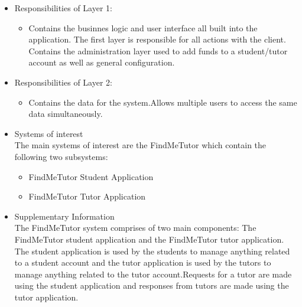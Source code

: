 \documentclass[12pt]{article}
\begin{document}
\begin{itemize}
\item Responsibilities of Layer 1:
\begin{itemize}
\item Contains the businnes logic and user interface all built into the application. The first layer is responsible for all actions with the client. Contains the administration layer used to add funds to a student/tutor account as well as general configuration.
\end{itemize}

\item Responsibilities of Layer 2:
\begin{itemize}
\item Contains the data for the system.Allows multiple users to access the same data simultaneously.
\end{itemize}

\item Systems of interest\\
The main systems of interest are the FindMeTutor which contain the following two subsystems:
\begin{itemize}
\item FindMeTutor Student Application
\item FindMeTutor Tutor Application
\end{itemize}

\item Supplementary Information\\
The FindMeTutor system comprises of two main components: The FindMeTutor student application and the FindMeTutor tutor application. The student application is used by the students to manage anything related to a student account and the tutor application is used by the tutors to manage anything related to the tutor account.Requests for a tutor are made using the student application and responses from tutors are made using the tutor application.
\end{itemize}
\end{document}
